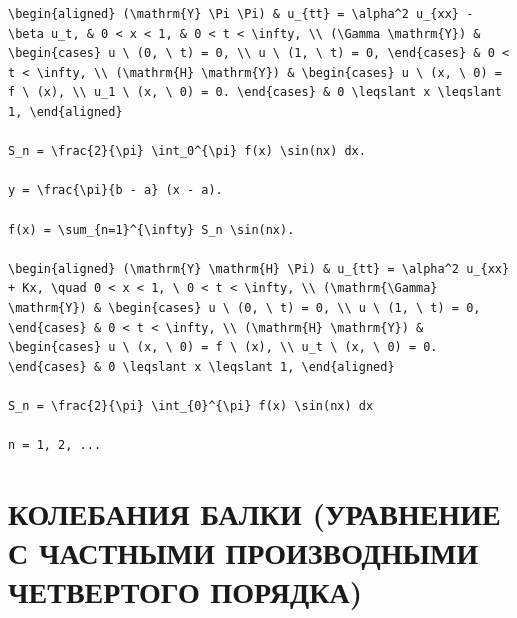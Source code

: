 \documentclass[
  ukrainian,
]{article}
\begin{document}
\begin{verbatim}
\begin{aligned} (\mathrm{Y} \Pi \Pi) & u_{tt} = \alpha^2 u_{xx} - \beta u_t, & 0 < x < 1, & 0 < t < \infty, \\ (\Gamma \mathrm{Y}) & \begin{cases} u \ (0, \ t) = 0, \\ u \ (1, \ t) = 0, \end{cases} & 0 < t < \infty, \\ (\mathrm{H} \mathrm{Y}) & \begin{cases} u \ (x, \ 0) = f \ (x), \\ u_1 \ (x, \ 0) = 0. \end{cases} & 0 \leqslant x \leqslant 1, \end{aligned}

S_n = \frac{2}{\pi} \int_0^{\pi} f(x) \sin(nx) dx.

y = \frac{\pi}{b - a} (x - a).

f(x) = \sum_{n=1}^{\infty} S_n \sin(nx).

\begin{aligned} (\mathrm{Y} \mathrm{H} \Pi) & u_{tt} = \alpha^2 u_{xx} + Kx, \quad 0 < x < 1, \ 0 < t < \infty, \\ (\mathrm{\Gamma} \mathrm{Y}) & \begin{cases} u \ (0, \ t) = 0, \\ u \ (1, \ t) = 0, \end{cases} & 0 < t < \infty, \\ (\mathrm{H} \mathrm{Y}) & \begin{cases} u \ (x, \ 0) = f \ (x), \\ u_t \ (x, \ 0) = 0. \end{cases} & 0 \leqslant x \leqslant 1, \end{aligned}

S_n = \frac{2}{\pi} \int_{0}^{\pi} f(x) \sin(nx) dx

n = 1, 2, ...
\end{verbatim}

\section{КОЛЕБАНИЯ БАЛКИ (УРАВНЕНИЕ С ЧАСТНЫМИ ПРОИЗВОДНЫМИ ЧЕТВЕРТОГО
ПОРЯДКА)}\label{ux43aux43eux43bux435ux431ux430ux43dux438ux44f-ux431ux430ux43bux43aux438-ux443ux440ux430ux432ux43dux435ux43dux438ux435-ux441-ux447ux430ux441ux442ux43dux44bux43cux438-ux43fux440ux43eux438ux437ux432ux43eux434ux43dux44bux43cux438-ux447ux435ux442ux432ux435ux440ux442ux43eux433ux43e-ux43fux43eux440ux44fux434ux43aux430}
\end{document}
